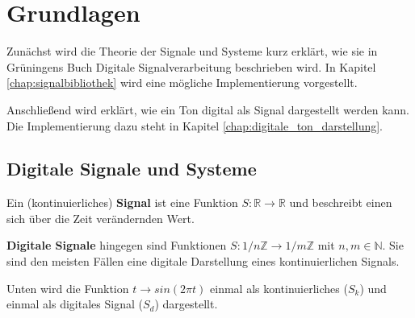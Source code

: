 \section{Grundlagen}


Zunächst wird die Theorie der Signale und Systeme kurz erklärt, wie sie 
in Grüningens Buch \glqq Digitale Signalverarbeitung\grqq \cite{grueningen2008dsv}
beschrieben wird. In Kapitel \ref{chap:signalbibliothek} wird eine mögliche Implementierung vorgestellt.

Anschließend wird erklärt, wie ein Ton digital als Signal dargestellt
werden kann. Die Implementierung dazu steht in Kapitel \ref{chap:digitale_ton_darstellung}.

\subsection{Digitale Signale und Systeme}

Ein (kontinuierliches) \textbf{Signal} ist eine Funktion 
$S: \mathbb{R} \rightarrow \mathbb{R}$ und beschreibt einen sich
über die Zeit verändernden Wert.

\textbf{Digitale Signale} hingegen sind Funktionen
$S: 1/n\mathbb{Z} \rightarrow 1/m\mathbb{Z}$ mit $n,m \in \mathbb{N}$. 
Sie sind den meisten Fällen eine digitale Darstellung eines kontinuierlichen Signals.

Unten wird die Funktion $ t \rightarrow sin(2\pi t) $ einmal als 
kontinuierliches ($S_k$) und einmal als digitales Signal ($S_d$) dargestellt.

